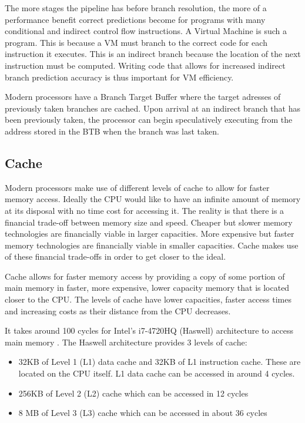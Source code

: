 \documentclass[english,a4paper,12pt]{report}
\begin{document}
The more stages the pipeline has before branch resolution, the more of
a performance benefit correct predictions become for programs with
many conditional and indirect control flow instructions. A Virtual
Machine is such a program. This is because a VM must branch to the
correct code for each instruction it executes. This is an indirect
branch because the location of the next instruction must be computed.
Writing code that allows for increased indirect branch prediction
accuracy is thus important for VM efficiency.

Modern processors have a Branch Target Buffer where the target
adresses of previously taken branches are cached. Upon arrival at an
indirect branch that has been previously taken, the processor can
begin speculatively executing from the address stored in the BTB when
the branch was last taken.

\subsection{Cache}
\label{sec:cache}
Modern processors make use of different levels of cache to allow for
faster memory access. Ideally the CPU would like to have an infinite
amount of memory at its disposal with no time cost for accessing
it. The reality is that there is a financial trade-off between memory
size and speed. Cheaper but slower memory technologies are financially
viable in larger capacities. More expensive but faster memory
technologies are financially viable in smaller capacities. Cache makes
use of these financial trade-offs in order to get closer to the ideal.

Cache allows for faster memory access by providing a copy of some
portion of main memory in faster, more expensive, lower capacity
memory that is located closer to the CPU. The levels of cache have
lower capacities, faster access times and increasing costs as their
distance from the CPU decreases.

It takes around 100 cycles for Intel's i7-4720HQ (Haswell)
architecture to access main memory \cite{7-cpu}. The Haswell architecture
provides 3 levels of cache:
\begin{itemize}
\item 32KB of Level 1 (L1) data cache and 32KB of L1 instruction
  cache. These are located on the CPU itself. L1 data cache can be
  accessed in around 4 cycles.
\item 256KB of Level 2 (L2) cache which can be accessed in 12
  cycles
\item  8 MB of Level 3 (L3) cache which can be accessed in about 36 cycles \cite{7-cpu}
\end{itemize}
\end{document}
